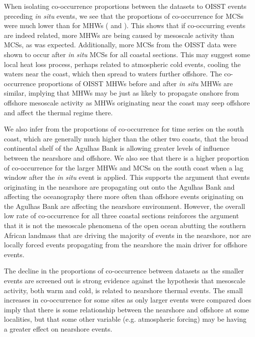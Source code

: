 \documentclass[a4paper,10pt,review]{elsarticle}
\begin{document}
When isolating co-occurrence proportions between the datasets to OISST events preceding \emph{in situ} events, we see that the proportions of co-occurrence for MCSs were much lower than for MHWs ( and ). This shows that if co-occurring events are indeed related, more MHWs are being caused by mesoscale activity than MCSs, as was expected. Additionally, more MCSs from the OISST data were shown to occur after \emph{in situ} MCSs for all coastal sections. This may suggest some local heat loss process, perhaps related to atmospheric cold events, cooling the waters near the coast, which then spread to waters further offshore. The co-occurrence proportions of OISST MHWs before and after \emph{in situ} MHWs are similar, implying that MHWs may be just as likely to propagate onshore from offshore mesoscale activity as MHWs originating near the coast may seep offshore and affect the thermal regime there.

We also infer from the proportions of co-occurrence for time series on the south coast, which are generally much higher than the other two coasts, that the broad continental shelf of the Agulhas Bank is allowing greater levels of influence between the nearshore and offshore. We also see that there is a higher proportion of co-occurrence for the larger MHWs and MCSs on the south coast when a lag window after the \emph{in situ} event is applied. This supports the argument that events originating in the nearshore are propagating out onto the Agulhas Bank and affecting the oceanography there more often than offshore events originating on the Agulhas Bank are affecting the nearshore environment. However, the overall low rate of co-occurrence for all three coastal sections reinforces the argument that it is not the mesoscale phenomena of the open ocean abutting the southern African landmass that are driving the majority of events in the nearshore, nor are locally forced events propagating from the nearshore the main driver for offshore events.

The decline in the proportions of co-occurrence between datasets as the smaller events are screened out is strong evidence against the hypothesis that mesoscale activity, both warm and cold, is related to nearshore thermal events. The small increases in co-occurrence for some sites as only larger events were compared does imply that there is some relationship between the nearshore and offshore at some localities, but that some other variable (e.g. atmospheric forcing) may be having a greater effect on nearshore events.
\end{document}
